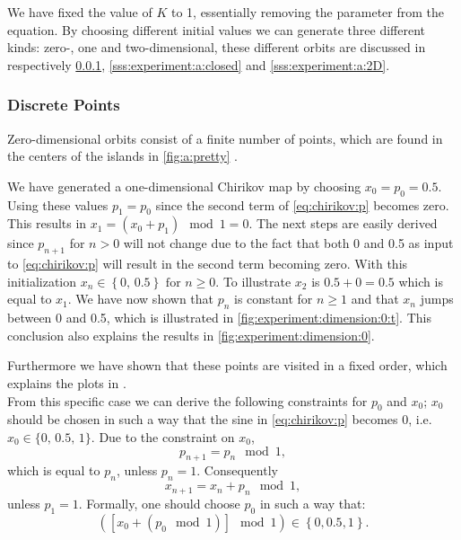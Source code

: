 We have fixed the value of $K$ to 1, essentially removing the parameter from the equation. By choosing different initial values we can generate three different kinds: zero-, one and two-dimensional, these different orbits are discussed in respectively \cref{sss:experiment:a:discrete}, \ref{sss:experiment:a:closed} and \ref{sss:experiment:a:2D}.


\subsubsection{Discrete Points}
\label{sss:experiment:a:discrete}
Zero-dimensional orbits consist of a finite number of points, which are found in the centers of the islands in \cref{fig:a:pretty} \cite{kenzel1997physics}. 

We have generated a one-dimensional Chirikov map by choosing $x_0 = p_0 = 0.5$. Using these values $p_1 = p_0$ since the second term of \eqref{eq:chirikov:p} becomes zero. This results in $x_1 = \left( x_0 + p_{1} \right) \mod 1= 0$. The next steps are easily derived since $p_{n + 1}$ for $n > 0$ will not change due to the fact that both 0 and 0.5 as input to \eqref{eq:chirikov:p} will result in the second term becoming zero. With this initialization $x_{n} \in \left\{0,\, 0.5 \right\} \text{ for } n \geq 0$. To illustrate $x_2$ is $0.5 + 0 = 0.5$ which is equal to $x_1$. We have now shown that $p_n$ is constant for $n \geq 1$ and that $x_n$ jumps between 0 and 0.5, which is illustrated in \cref{fig:experiment:dimension:0:t}. This conclusion also explains the results in \cref{fig:experiment:dimension:0}. 

Furthermore we have shown that these points are visited in a fixed order, which explains the plots in .\\

From this specific case we can derive the following constraints for $p_0$ and $x_0$; $x_0$ should be chosen in such a way that the sine in \cref{eq:chirikov:p} becomes 0, i.e. $x_0 \in \{0,\, 0.5,\, 1\}$. Due to the constraint on $x_0$,
\begin{equation*}
p_{n + 1} = p_{n} \mod 1,
\end{equation*}
	which is equal to $p_n$, unless $p_n = 1$. Consequently
	\begin{equation*}
	x_{n + 1} = x_n + p_n \mod 1,
	\end{equation*}
unless $p_1 = 1$. Formally, one should choose $p_0$ in such a way that:
\begin{equation*}
	\left( \left[ x_0 + (p_0 \mod 1)\right] \mod 1 \right) \in \left\{0, 0.5, 1\right\}.
\end{equation*}

